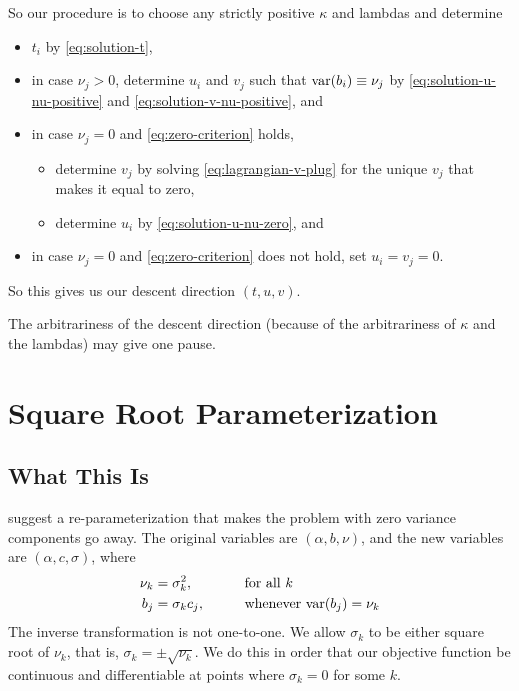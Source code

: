 So our procedure is to choose any strictly positive $\kappa$ and lambdas
and determine
\begin{itemize}
\item $t_i$ by \eqref{eq:solution-t},
\item in case $\nu_j > 0$, determine $u_i$ and $v_j$
    such that $\operatorname{var}(b_i) \equiv \nu_j$ by
    \eqref{eq:solution-u-nu-positive} and \eqref{eq:solution-v-nu-positive},
    and
\item in case $\nu_j = 0$ and \eqref{eq:zero-criterion} holds,
\begin{itemize}
\item determine $v_j$ by solving \eqref{eq:lagrangian-v-plug} for the
    unique $v_j$ that makes it equal to zero,
\item determine $u_i$ by \eqref{eq:solution-u-nu-zero}, and
\end{itemize}
\item in case $\nu_j = 0$ and \eqref{eq:zero-criterion} does not hold,
    set $u_i = v_j = 0$.
\end{itemize}
So this gives us our descent direction $(t, u, v)$.

The arbitrariness of the descent direction (because of the arbitrariness
of $\kappa$ and the lambdas) may give one pause.

\section{Square Root Parameterization}

\subsection{What This Is}

\citet{reaster} suggest a re-parameterization that makes the problem with
zero variance components go away.
The original variables are $(\alpha, b, \nu)$, and
the new variables are $(\alpha, c, \sigma)$, where
\begin{alignat*}{2}
   \nu_k & = \sigma^2_k, & \qquad & \text{for all $k$}
   \\
   b_j & = \sigma_k c_j, & & \text{whenever $\operatorname{var}(b_j) = \nu_k$}
\end{alignat*}
The inverse transformation is not one-to-one.  We allow $\sigma_k$ to be
either square root of $\nu_k$, that is, $\sigma_k = \pm \sqrt{\nu_k}$.
We do this in order that our objective function be continuous and
differentiable at points where $\sigma_k = 0$ for some $k$.

